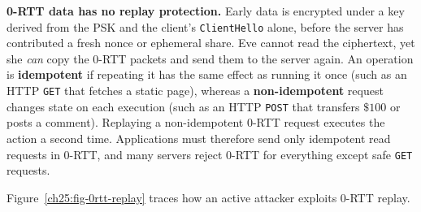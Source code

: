 \begin{trapbox}
\textbf{0-RTT data has no replay protection.} Early data is encrypted under a key
derived from the PSK and the client's \texttt{ClientHello} alone, before the server
has contributed a fresh nonce or ephemeral share. Eve cannot read the ciphertext,
yet she \emph{can} copy the 0-RTT packets and send them to the server again. An
operation is \textbf{idempotent} if repeating it has the same effect as running it
once (such as an HTTP \texttt{GET} that fetches a static page), whereas a
\textbf{non-idempotent} request changes state on each execution (such as an HTTP
\texttt{POST} that transfers $\$100$ or posts a comment). Replaying a non-idempotent
0-RTT request executes the action a second time. Applications must therefore send
only idempotent read requests in 0-RTT, and many servers reject 0-RTT for everything
except safe \texttt{GET} requests.
\end{trapbox}

Figure~\ref{ch25:fig-0rtt-replay} traces how an active attacker exploits 0-RTT replay.

